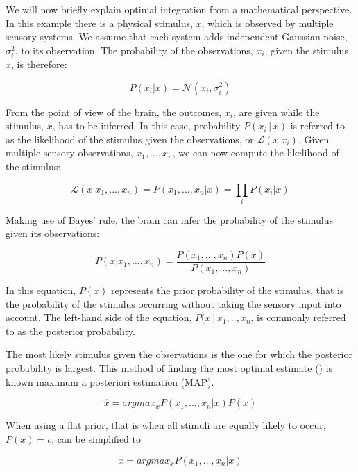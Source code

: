 We will now briefly explain optimal integration from a mathematical perspective.  In this example there is a physical stimulus, $x$, which is observed by multiple sensory systems. We assume that each system adds independent Gaussian noise, $\sigma_i^2$, to its observation. The probability of the observations, $x_i$, given the stimulus $x$, is therefore:

\begin{equation}
P(x_i|x)= \mathcal{N}(x_i, \sigma_i^2)
\end{equation}

From the point of view of the brain, the outcomes, $x_i$, are given while the stimulus, $x$, has to be inferred. In this case, probability $P(x_i│x)$ is referred to as the likelihood of  the  stimulus given the observations, or $\mathcal{L}(x|x_i)$. Given multiple sensory observations, $x_1,...,x_n$, we can now compute the likelihood of the stimulus:

\begin{equation}
\mathcal{L}(x|x_1,...,x_n) = P(x_1,...,x_n|x) = \prod_i P(x_i|x)
\end{equation}

Making use of Bayes' rule, the  brain can infer the probability of the stimulus given its observations:

\begin{equation}
P(x|x_1,...,x_n) = \frac{P(x_1,...,x_n)P(x)}{P(x_1,...,x_n)}
\end{equation}

In this equation, $P(x)$ represents the prior probability of the stimulus, that is the probability of the stimulus occurring without taking the sensory input into account. The left-hand side of the equation, $P(x│x_1,..,x_n$, is commonly referred to as the posterior probability.

The  most likely stimulus given the observations is  the one for which the posterior probability is largest. This method of finding the most optimal estimate () is known maximum a posteriori estimation (MAP).

\begin{equation}
\hat{x} = argmax_x P(x_1,...,x_n|x)P(x)
\label{intro:eq:map}
\end{equation}

When using a flat prior, that is when all stimuli are equally likely to occur, $P(x)=c$,  can be simplified to

\begin{equation}
\hat{x} = argmax_x P(x_1,...,x_n|x)
\label{intro:eq:mle}
\end{equation}

